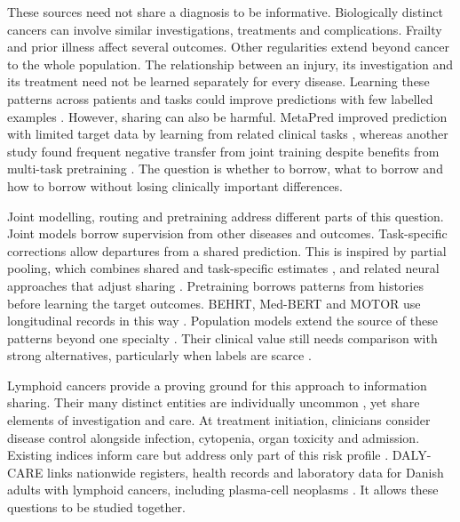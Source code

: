 These sources need not share a diagnosis to be informative. Biologically
distinct cancers can involve similar investigations, treatments and
complications. Frailty and prior illness affect several outcomes. Other
regularities extend beyond cancer to the whole population. The relationship
between an injury, its investigation and its treatment need not be learned
separately for every disease. Learning these patterns across patients and tasks
could improve predictions with few labelled examples
\citep{Baxter2000,Maurer2016}. However, sharing can also be harmful. MetaPred
improved prediction with limited target data by learning from related clinical
tasks \citep{zhang2019metapred}, whereas another study found frequent negative
transfer from joint training despite benefits from multi-task pretraining
\citep{mcdermott2020mtl}. The question is whether to borrow, what to borrow and
how to borrow without losing clinically important differences.

Joint modelling, routing and pretraining address different parts of this
question. Joint models borrow supervision from other diseases and outcomes.
Task-specific corrections allow departures from a shared prediction. This is
inspired by partial pooling, which combines shared and task-specific estimates
\citep{EfronMorris1975}, and related neural approaches that adjust sharing
\citep{cui2024autodp,lee2022residualmoe}. Pretraining borrows patterns from
histories before learning the target outcomes. BEHRT, Med-BERT and MOTOR use
longitudinal records in this way
\citep{li2020behrt,rasmy2021med,steinberg2023motor}. Population models extend
the source of these patterns beyond one specialty
\citep{savcisens2024life2vec,shmatko2025delphi}. Their clinical value still needs
comparison with strong alternatives, particularly when labels are scarce
\citep{wornow2023shaky,worth2026state,wornow2023ehrshot}.

Lymphoid cancers provide a proving ground for this approach to information
sharing. Their many distinct entities are individually uncommon
\citep{alaggio2022who,sant2010haemacare}, yet share elements of investigation
and care. At treatment initiation, clinicians consider disease control alongside
infection, cytopenia, organ toxicity and admission. Existing indices inform
care but address only part of this risk profile
\citep{DLG2025DLBCL,Tilly2022POLARIX,Langerbeins2022CLL12}. DALY-CARE links
nationwide registers, health records and laboratory data for Danish adults
with lymphoid cancers, including plasma-cell neoplasms
\citep{brieghel2025dalycare}. It allows these questions to be studied together.

